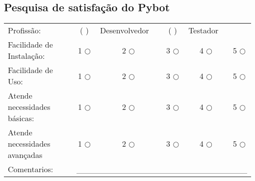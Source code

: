 %
%

\begin{apendicesenv}

    \chapter{Pesquisa de satisfação do Pybot}

    \begin{table}[H]
    \setlength\extrarowheight{25pt}
    \begin{tabular}{lccccc}
        Profissão:                    & (  )         & \multicolumn{1}{l}{Desenvolvedor}  & (  )         & \multicolumn{1}{l}{Testador}   &              \\
        Facilidade de Instalação:     & 1 $\bigcirc$ & 2 $\bigcirc$                       & 3 $\bigcirc$ & 4 $\bigcirc$                   & 5 $\bigcirc$ \\
        Facilidade de Uso:            & 1 $\bigcirc$ & 2 $\bigcirc$                       & 3 $\bigcirc$ & 4 $\bigcirc$                   & 5 $\bigcirc$ \\
        Atende necessidades básicas:  & 1 $\bigcirc$ & 2 $\bigcirc$                       & 3 $\bigcirc$ & 4 $\bigcirc$                   & 5 $\bigcirc$ \\
        Atende necessidades avançadas & 1 $\bigcirc$ & 2 $\bigcirc$                       & 3 $\bigcirc$ & 4 $\bigcirc$                   & 5 $\bigcirc$ \\
        Comentarios:                  & \multicolumn{5}{l}{\_\_\_\_\_\_\_\_\_\_\_\_\_\_\_\_\_\_\_\_\_\_\_\_\_\_\_\_\_}
    \end{tabular}
    \end{table}

\end{apendicesenv}
